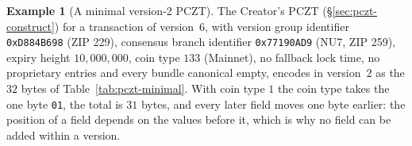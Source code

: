 \documentclass[11pt,a4paper]{article}
\theoremstyle{definition}
\newtheorem{example}[theorem]{Example}
\begin{document}
\begin{example}[A minimal version-2 PCZT]\label{ex:pczt-minimal}
The Creator's PCZT (\S\ref{sec:pczt-construct}) for a transaction of
version~$6$, with version group identifier \texttt{0xD884B698} (ZIP 229),
consensus branch identifier \texttt{0x77190AD9} (NU7, ZIP 259), expiry
height $10{,}000{,}000$, coin type $133$ (Mainnet), no fallback lock time,
no proprietary entries and every bundle canonical empty, encodes in version~$2$
as the $32$ bytes of Table~\ref{tab:pczt-minimal}. With coin type $1$ the
coin type takes the one byte \texttt{01}, the total is $31$ bytes, and
every later field moves one byte earlier: the position of a field depends
on the values before it, which is why no field can be added within a
version.
\end{example}
\end{document}
